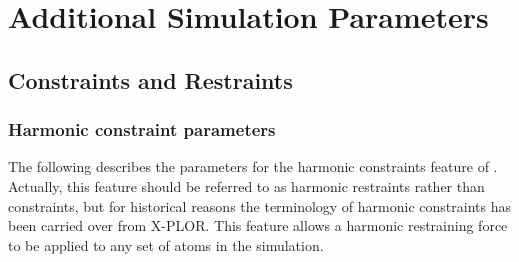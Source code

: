 
\section{Additional Simulation Parameters}
\label{section:add}

\subsection{Constraints and Restraints}
\label{section:config_add}

\subsubsection{Harmonic constraint parameters}

The following describes the parameters for the 
harmonic constraints feature of \PDAC.  Actually, this feature 
should be referred to as harmonic restraints rather than 
constraints, but for historical reasons the terminology of 
harmonic constraints has been carried over from X-PLOR.  
This feature allows a harmonic restraining force to be applied 
to any set of atoms in the simulation.

